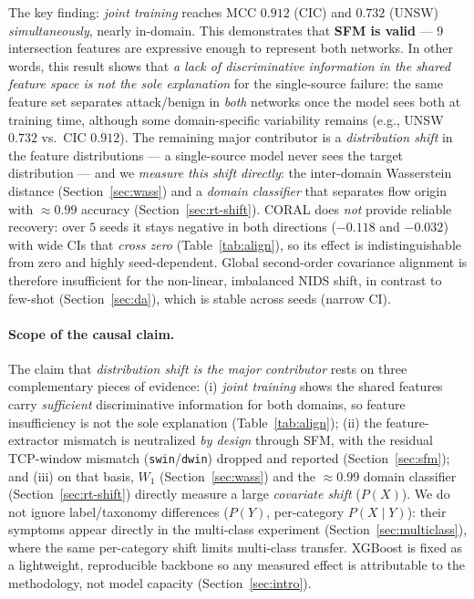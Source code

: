 \documentclass[preprint,12pt,authoryear]{elsarticle}
\begin{document}
The key finding: \emph{joint training} reaches MCC $0.912$ (CIC) and $0.732$
(UNSW) \emph{simultaneously}, nearly in-domain. This demonstrates that \textbf{SFM
is valid} --- 9 intersection features are expressive enough to represent both
networks. In
other words, this result shows that \emph{a lack of discriminative information in
the shared feature space is not the sole explanation} for the single-source
failure: the same feature set separates attack/benign in \emph{both} networks once
the model sees both at training time, although some domain-specific variability
remains (e.g., UNSW $0.732$ vs.\ CIC $0.912$). The remaining major contributor is a
\emph{distribution shift} in the feature distributions --- a single-source model
never sees the target distribution --- and we \emph{measure this shift directly}:
the inter-domain Wasserstein distance (Section~\ref{sec:wass}) and a
\emph{domain classifier} that separates flow origin with $\approx 0.99$ accuracy
(Section~\ref{sec:rt-shift}). CORAL does \emph{not} provide reliable recovery: over
$5$ seeds it stays negative in both directions ($-0.118$ and $-0.032$) with wide CIs
that \emph{cross zero} (Table~\ref{tab:align}), so its effect is indistinguishable
from zero and highly seed-dependent. Global second-order covariance alignment is
therefore insufficient for the non-linear, imbalanced NIDS shift, in contrast to
few-shot (Section~\ref{sec:da}), which is stable across seeds (narrow CI).

\paragraph{Scope of the causal claim.} The claim that \emph{distribution shift is
the major contributor} rests on three complementary pieces of evidence: (i)
\emph{joint training} shows the shared features carry \emph{sufficient}
discriminative information for both domains, so feature insufficiency is not the
sole explanation (Table~\ref{tab:align}); (ii) the feature-extractor mismatch is
neutralized \emph{by design} through SFM, with the residual TCP-window mismatch
(\texttt{swin}/\texttt{dwin}) dropped and reported (Section~\ref{sec:sfm}); and
(iii) on that basis, $W_1$ (Section~\ref{sec:wass}) and the $\approx 0.99$ domain
classifier (Section~\ref{sec:rt-shift}) directly measure a large \emph{covariate
shift} ($P(X)$). We do not ignore label/taxonomy differences ($P(Y)$, per-category
$P(X\mid Y)$): their symptoms appear directly in the multi-class experiment
(Section~\ref{sec:multiclass}), where the same per-category shift limits multi-class
transfer. XGBoost is fixed as a lightweight, reproducible backbone so any measured
effect is attributable to the methodology, not model capacity
(Section~\ref{sec:intro}).
\end{document}
